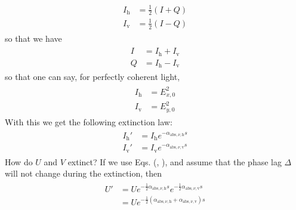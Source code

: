 \documentclass[letterpaper,10pt,english]{sphinxmanual}
\begin{document}
\label{\detokenize{dustradtrans:eq-modif-stokes-hv}}\begin{equation*}
\begin{split}\begin{split}
I_{\mathrm{h}} &= \frac{1}{2}(I+Q)\\
I_{\mathrm{v}} &= \frac{1}{2}(I-Q)
\end{split}\end{split}
\end{equation*}
so that we have
\begin{equation*}
\begin{split}\begin{split}
I &= I_{\mathrm{h}}+I_{\mathrm{v}}\\
Q &= I_{\mathrm{h}}-I_{\mathrm{v}}
\end{split}\end{split}
\end{equation*}
so that one can say, for perfectly coherent light,
\begin{equation*}
\begin{split}\begin{split}
I_{\mathrm{h}} &= E_{x,0}^2\\
I_{\mathrm{v}} &= E_{y,0}^2
\end{split}\end{split}
\end{equation*}
With this we get the following extinction law:
\begin{equation*}
\begin{split}\begin{split}
I_{\mathrm{h}}' &= I_{\mathrm{h}} e^{-\alpha_{\mathrm{abs},\nu,\mathrm{h}}s}\\
I_{\mathrm{v}}' &= I_{\mathrm{v}} e^{-\alpha_{\mathrm{abs},\nu,\mathrm{v}}s}
\end{split}\end{split}
\end{equation*}
How do \(U\) and \(V\) extinct? If we use Eqs. (,
), and assume that the phase lag \(\Delta\) will not
change during the extinction, then
\begin{equation*}
\begin{split}\begin{split}
U' &= U e^{-\tfrac{1}{2}\alpha_{\mathrm{abs},\nu,\mathrm{h}}s} e^{-\tfrac{1}{2}\alpha_{\mathrm{abs},\nu,\mathrm{v}}s}\\
   &= U e^{-\tfrac{1}{2}(\alpha_{\mathrm{abs},\nu,\mathrm{h}}+\alpha_{\mathrm{abs},\nu,\mathrm{v}})s}
\end{split}\end{split}
\end{equation*}
\end{document}
